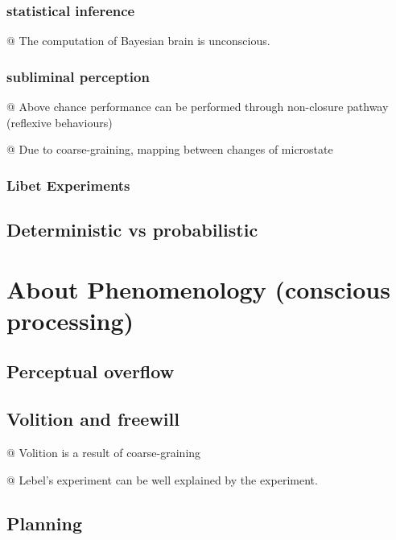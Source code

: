 \documentclass[utf8]{article}
\begin{document}
\begin{backup}
		\subsubsection{statistical inference}
		\begin{ants}
			@ The computation of Bayesian brain is unconscious.
		\end{ants}

		\subsubsection{subliminal perception}
		\begin{ants}
			@ Above chance performance can be performed through non-closure pathway (reflexive behaviours)

			@ Due to coarse-graining, mapping between changes of microstate
		\end{ants}
		\subsubsection{Libet Experiments}


		\subsection{Deterministic vs probabilistic}
		\cite{dehaene2017consciousness}
		\cite{vul2008temporal, moreno2011bayesian, asplund2014attentional, vul2009attention}


	\section*{About Phenomenology (conscious processing)}
\subsection{Perceptual overflow}
\subsection{Volition and freewill}
\begin{ants}
	@ Volition is a result of coarse-graining

	@ Lebel's experiment can be well explained by the experiment.
\end{ants}



\subsection{Planning}

\end{backup}
\end{document}
